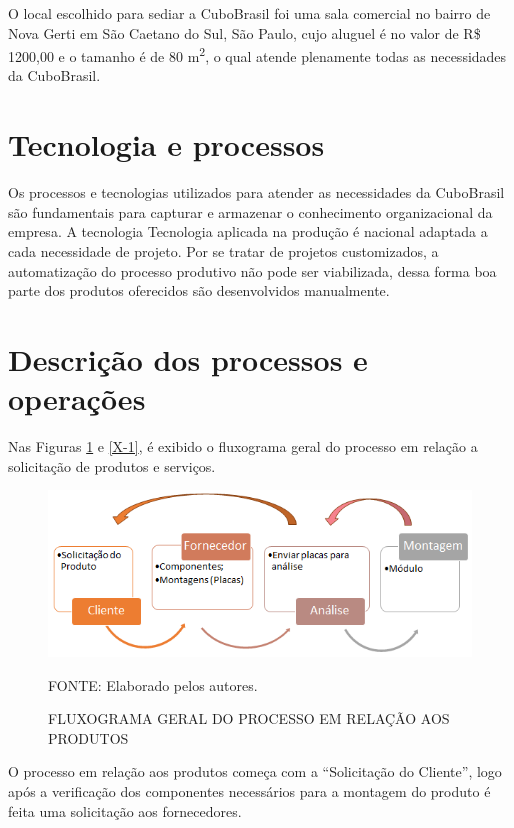 \documentclass[
	12pt,				%
	openright,			%
	oneside,			%
	a4paper,			%
	english,			%
	french,				%
	spanish,			%
	brazil				%
	]{abntex2}
\begin{document}
	O local escolhido para sediar a CuboBrasil foi uma sala comercial no bairro de Nova Gerti em São Caetano do Sul, São Paulo, cujo aluguel é no valor de R\$ 1200,00 e o tamanho é de 80 m\textsuperscript{2}, o qual atende plenamente todas as necessidades da CuboBrasil. 
	
\section[Tecnologia e processos]{Tecnologia e processos}

	Os processos e tecnologias utilizados para atender as necessidades da CuboBrasil são fundamentais para capturar e armazenar o conhecimento organizacional da empresa. A tecnologia Tecnologia aplicada na produção é nacional adaptada a cada necessidade de projeto. Por se tratar de projetos customizados, a automatização do processo produtivo não pode ser viabilizada, dessa forma boa parte dos produtos oferecidos são desenvolvidos manualmente.

\section[Descrição dos processos e operações]{Descrição dos processos e operações}

	Nas Figuras \ref{X} e \ref{X-1}, é exibido o fluxograma geral do processo em relação a solicitação de produtos e serviços.
	
	\begin{figure}[th]
		\caption{FLUXOGRAMA GERAL DO PROCESSO EM RELAÇÃO AOS PRODUTOS}
		\label{X}
		\centering
		\includegraphics[width=1.0\linewidth]{./figs/X}
		
		\begin{small}
			FONTE: Elaborado pelos autores.
		\end{small}
	\end{figure}
	
	O processo em relação aos produtos começa com a “Solicitação do Cliente”, logo após a verificação dos componentes necessários para a montagem do produto é feita uma solicitação aos fornecedores.
	
\end{document}

